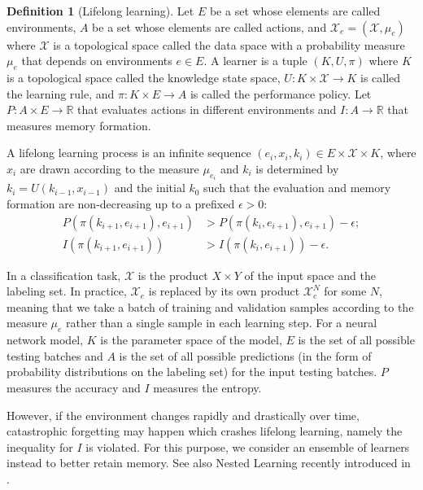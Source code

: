 \documentclass{article}
\theoremstyle{plain}
\theoremstyle{definition}
\newtheorem{definition}[theorem]{Definition}
\theoremstyle{remark}
\newcommand{\R}{\mathbb{R}}
\newcommand{\cX}{\mathcal{X}}
\begin{document}
\begin{definition}[Lifelong learning]
	Let $E$ be a set whose elements are called environments, $A$ be a set whose elements are called actions, and
	$\cX_e = (\cX,\mu_e)$ where $\cX$ is a topological space called the data space with a probability measure $\mu_e$ that depends on environments $e\in E$. A learner is a tuple $(K,U,\pi)$ where $K$ is a topological space called the knowledge state space, $U: K \times \cX \to K$ is called the learning rule, and $\pi:K\times E \to A$ is called the performance policy.
	Let $P: A\times E\to\R$ that evaluates actions in different environments and $I:A \to \R$ that measures memory formation.
	
	A lifelong learning process is an infinite sequence $(e_i,x_i,k_i) \in E \times \cX \times K$, where $x_i$ are drawn according to the measure $\mu_{e_i}$ and $k_i$ is determined by $k_{i} = U(k_{i-1},x_{i-1})$ and the initial $k_0$ such that the evaluation and memory formation are non-decreasing up to a prefixed $\epsilon>0$:
	\begin{align*}
		P(\pi(k_{i+1},e_{i+1}),e_{i+1}) & > P(\pi(k_{i},e_{i+1}),e_{i+1}) - \epsilon; \\
		I(\pi(k_{i+1},e_{i+1})) &> I(\pi(k_{i},e_{i+1})) - \epsilon. 
	\end{align*}
\end{definition}

In a classification task, $\cX$ is the product $X\times Y$ of the input space and the labeling set. In practice, $\cX_e$ is replaced by its own product $\cX_e^N$ for some $N$, meaning that we take a batch of training and validation samples according to the measure $\mu_e$ rather than a single sample in each learning step. For a neural network model, $K$ is the parameter space of the model, $E$ is the set of all possible testing batches and $A$ is the set of all possible predictions (in the form of probability distributions on the labeling set) for the input testing batches.  
$P$ measures the accuracy and $I$ measures the entropy.

However, if the environment changes rapidly and drastically over time, catastrophic forgetting may happen \cite{catastrophic,van_de_Ven_2025} which crashes lifelong learning, namely the inequality for $I$ is violated. For this purpose, we consider an ensemble of learners instead to better retain memory. See also Nested Learning recently introduced in \cite{Google_nested}. 
\end{document}
